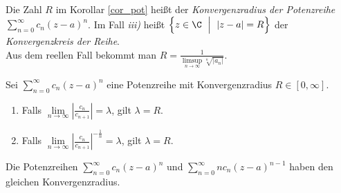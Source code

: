 		\begin{defn}[Konvergenzradius]
			Die Zahl $R$ im Korollar \ref{cor_pot} heißt der \emph{Konvergenzradius der Potenzreihe} $ \sum\limits_{n=0}^\infty c_n (z-a)^n $. Im Fall \textit{iii)} heißt $ \Bigl\{ z \in \C\ \Bigm|\ |z-a|=R \Bigr\} $ der \emph{Konvergenzkreis der Reihe}.\\
			Aus dem reellen Fall bekommt man $ R = \frac{1}{\limsup\limits_{n \to \infty}\sqrt[n]{|a_n|}} $.
		\end{defn}
		
		\begin{thm}
			Sei $ \sum\limits_{n=0}^\infty c_n (z-a)^n $ eine Potenzreihe mit Konvergenzradius $ R \in [0,\infty] $.
			\begin{enumerate}[label = {\roman*})]
				\item Falls $ \lim\limits_{n \to \infty} \left|\frac{c_n}{c_{n+1}}\right| = \lambda $, gilt $ \lambda = R $.
				\item Falls $ \lim\limits_{n \to \infty} \left|\frac{c_n}{c_{n+1}}\right|^{-\frac{1}{n}} = \lambda $, gilt $ \lambda = R $.
			\end{enumerate}
		\end{thm}
		
		\begin{thm}
			Die Potenzreihen $ \sum\limits_{n=0}^\infty c_n (z-a)^n $ und $ \sum\limits_{n=0}^\infty n c_n (z-a)^{n-1} $ haben den gleichen Konvergenzradius.
		\end{thm}